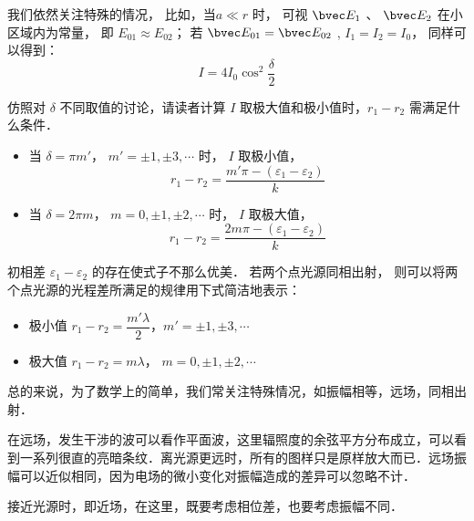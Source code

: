 我们依然关注特殊的情况， 比如，当$ a \ll r $ 时， 可视 $ \bvec E_1$ 、 $ \bvec E_2$ 在小区域内为常量， 即 $ E_{ 01} \approx E_{02}$； 若 $ \bvec E_{01} = \bvec E_{02} $ , $ I_1 = I_2 = I_0 $， 同样可以得到：
$$ I = 4 I_0 \cos ^2\dfrac { \delta } { 2 }$$

\begin{exercise}{}
仿照对 $ \delta$ 不同取值的讨论，请读者计算 $ I $ 取极大值和极小值时，$ r_1 - r_2 $ 需满足什么条件．
\end{exercise}

\begin{itemize}
\item 当 $ \delta = \pi m'$， $ m' = \pm 1, \pm 3, \cdots $ 时， $ I $ 取极小值， 
$$ r_1 - r_2 = \dfrac{ m' \pi - ( \varepsilon _1 - \varepsilon _2)} { k } $$
\item 当 $ \delta = 2 \pi m$， $ m = 0, \pm 1, \pm 2, \cdots $ 时， $ I $ 取极大值， 
$$ r_1 - r_2 = \dfrac{ 2m \pi - ( \varepsilon _1 - \varepsilon _2)} { k } $$
\end{itemize}

初相差 $ \varepsilon_1 - \varepsilon_2 $ 的存在使式子不那么优美． 若两个点光源同相出射， 则可以将两个点光源的光程差所满足的规律用下式简洁地表示：

\begin{corollary}{}

\begin{itemize}
\item 极小值 $ r_1 - r_2 = \dfrac{ m' \lambda} { 2 } $，$ m' = \pm 1, \pm 3, \cdots $

\item 极大值 $ r_1 - r_2 = m \lambda $， $m = 0 ,\pm 1, \pm 2,\cdots $
\end{itemize}

\end{corollary}


总的来说，为了数学上的简单，我们常关注特殊情况，如振幅相等，远场，同相出射．

在远场，发生干涉的波可以看作平面波，这里辐照度的余弦平方分布成立，可以看到一系列很直的亮暗条纹．离光源更远时，所有的图样只是原样放大而已．远场振幅可以近似相同，因为电场的微小变化对振幅造成的差异可以忽略不计．

接近光源时，即近场，在这里，既要考虑相位差，也要考虑振幅不同．








